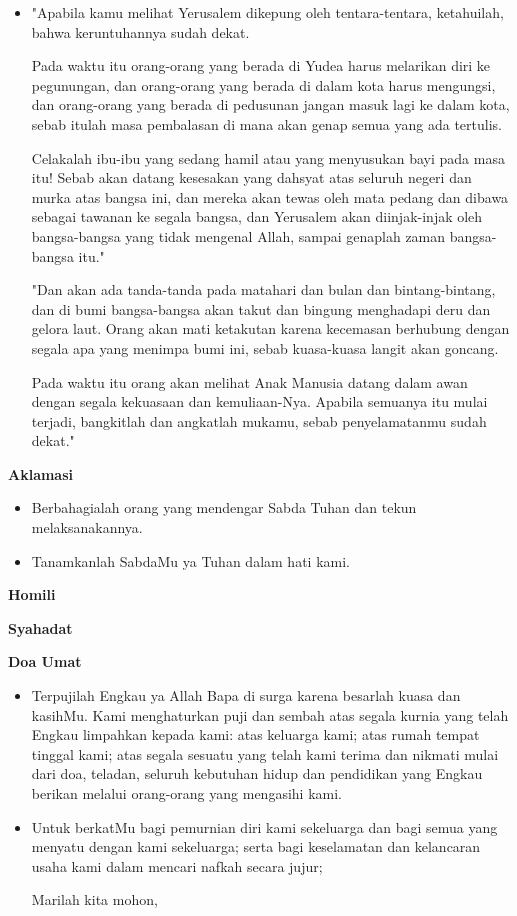 \documentclass[a5paper,headsepline,titlepage,12pt,nnormalheadings,DIVcalc,twoside]{scrbook}
\makeatletter
\newcommand{\subjudul}[1]{%
  {\parindent \z@ 
    \interlinepenalty\@M \bfseries #1\par\nobreak \vskip 10\p@ }}
\newcommand{\BU}[1]{\begin{itemize} \item[U:] #1 \end{itemize}}
\newcommand{\BI}[1]{\begin{itemize} \item[I:] #1 \end{itemize}}
\newcommand{\BP}[1]{\begin{itemize} \item[P:] #1 \end{itemize}}
\makeatother
\begin{document}
\BI{"Apabila kamu melihat Yerusalem dikepung oleh tentara-tentara, ketahuilah, bahwa keruntuhannya sudah dekat.

Pada waktu itu orang-orang yang berada di Yudea harus melarikan diri ke pegunungan, dan orang-orang yang berada di dalam kota harus mengungsi, dan orang-orang yang berada di pedusunan jangan masuk lagi ke dalam kota, sebab itulah masa pembalasan di mana akan genap semua yang ada tertulis.

Celakalah ibu-ibu yang sedang hamil atau yang menyusukan bayi pada masa itu! Sebab akan datang kesesakan yang dahsyat atas seluruh negeri dan murka atas bangsa ini,
dan mereka akan tewas oleh mata pedang dan dibawa sebagai tawanan ke segala bangsa, dan Yerusalem akan diinjak-injak oleh bangsa-bangsa yang tidak mengenal Allah, sampai genaplah zaman bangsa-bangsa itu."

"Dan akan ada tanda-tanda pada matahari dan bulan dan bintang-bintang, dan di bumi bangsa-bangsa akan takut dan bingung menghadapi deru dan gelora laut.
Orang akan mati ketakutan karena kecemasan berhubung dengan segala apa yang menimpa bumi ini, sebab kuasa-kuasa langit akan goncang.

Pada waktu itu orang akan melihat Anak Manusia datang dalam awan dengan segala kekuasaan dan kemuliaan-Nya.
Apabila semuanya itu mulai terjadi, bangkitlah dan angkatlah mukamu, sebab penyelamatanmu sudah dekat."}

\subjudul{Aklamasi}

\BI{Berbahagialah orang yang mendengar Sabda Tuhan dan 
tekun melaksanakannya.}

\BU{Tanamkanlah SabdaMu ya Tuhan dalam hati kami.}

 

\subjudul{Homili}

\subjudul{Syahadat} 

\subjudul{Doa Umat}

\BI{Terpujilah Engkau ya Allah Bapa di surga karena besarlah kuasa 
dan kasihMu. Kami menghaturkan puji dan sembah atas segala 
kurnia yang telah Engkau limpahkan kepada kami: atas keluarga 
kami; atas rumah tempat tinggal kami; atas segala sesuatu yang 
telah kami terima dan nikmati mulai dari doa, teladan, seluruh 
kebutuhan hidup dan pendidikan yang Engkau berikan melalui 
orang-orang yang mengasihi kami.}

\BP{Untuk berkatMu bagi pemurnian diri kami sekeluarga dan 
bagi semua yang menyatu dengan kami sekeluarga; serta 
bagi keselamatan dan kelancaran usaha kami dalam mencari 
nafkah secara jujur; 

Marilah kita mohon,}
\end{document}
